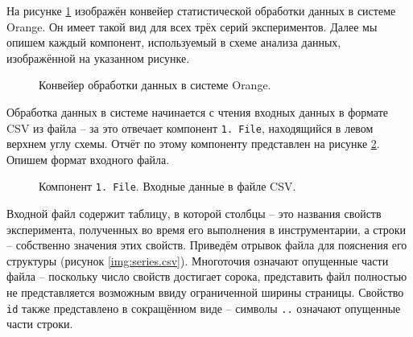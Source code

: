 На рисунке \ref{img:series30} изображён конвейер статистической обработки данных в системе Orange. Он имеет такой вид для всех трёх серий экспериментов. Далее мы опишем каждый компонент, используемый в схеме анализа данных, изображённой на указанном рисунке.

\begin{figure}[H]
    \caption{Конвейер обработки данных в системе Orange.}
    \label{img:series30}
\end{figure}

Обработка данных в системе начинается с чтения входных данных в формате CSV из файла -- за это отвечает компонент \texttt{1. File}, находящийся в левом верхнем углу схемы. Отчёт по этому компоненту представлен на рисунке \ref{img:1-File}. Опишем формат входного файла.

\begin{figure}[H]
    \caption{Компонент \texttt{1. File}. Входные данные в файле CSV.}
    \label{img:1-File}
\end{figure}

Входной файл содержит таблицу, в которой столбцы -- это названия свойств эксперимента, полученных во время его выполнения в инструментарии, а строки -- собственно значения этих свойств. Приведём отрывок файла для пояснения его структуры (рисунок \ref{img:series.csv}). Многоточия означают опущенные части файла -- поскольку число свойств достигает сорока, представить файл полностью не представляется возможным ввиду ограниченной ширины страницы. Свойство \texttt{id} также представлено в сокращённом виде -- символы \texttt{..} означают опущенные части строки.


